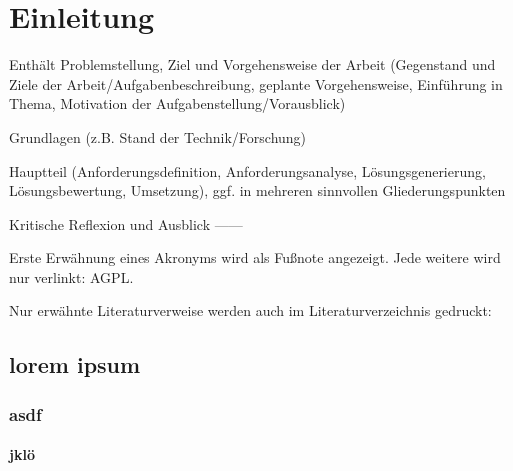 
\chapter{Einleitung}
Enthält Problemstellung, Ziel und Vorgehensweise der Arbeit (Gegenstand und Ziele der Arbeit/Aufgabenbeschreibung,
geplante Vorgehensweise, Einführung in Thema, Motivation der Aufgabenstellung/Vorausblick)

Grundlagen (z.B. Stand der Technik/Forschung)

Hauptteil (Anforderungsdefinition, Anforderungsanalyse, Lösungsgenerierung, Lösungsbewertung, Umsetzung),
ggf. in mehreren sinnvollen Gliederungspunkten

Kritische Reflexion und Ausblick
------

Erste Erwähnung eines Akronyms wird als Fußnote angezeigt. Jede weitere wird
nur verlinkt: \acf{AGPL}. \cite{fsf, baumgartner}

Nur erwähnte Literaturverweise werden auch im Literaturverzeichnis gedruckt:
\cites[150--130]{baumgartner}[S.~150f.]{dreyfus}

\lipsum[1]

\section{lorem ipsum}

\subsection{asdf}
\subsubsection{jklö}